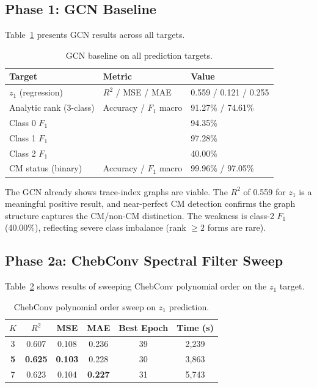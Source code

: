 \documentclass[11pt]{article}
\begin{document}
\subsection{Phase 1: GCN Baseline}

Table~\ref{tab:gcn-baseline} presents GCN results across all targets.

\begin{table}[t]
\centering
\caption{GCN baseline on all prediction targets.}
\label{tab:gcn-baseline}
\begin{tabular}{@{}lll@{}}
\toprule
Target & Metric & Value \\
\midrule
$z_1$ (regression) & $R^2$ / MSE / MAE & 0.559 / 0.121 / 0.255 \\
\midrule
Analytic rank (3-class) & Accuracy / $F_1$ macro & 91.27\% / 74.61\% \\
\quad Class 0 $F_1$ & & 94.35\% \\
\quad Class 1 $F_1$ & & 97.28\% \\
\quad Class 2 $F_1$ & & 40.00\% \\
\midrule
CM status (binary) & Accuracy / $F_1$ macro & 99.96\% / 97.05\% \\
\bottomrule
\end{tabular}
\end{table}

The GCN already shows trace-index graphs are viable. The $R^2$ of 0.559 for $z_1$ is a meaningful positive result, and near-perfect CM detection confirms the graph structure captures the CM/non-CM distinction. The weakness is class-2 $F_1$ (40.00\%), reflecting severe class imbalance (rank $\geq 2$ forms are rare).

\subsection{Phase 2a: ChebConv Spectral Filter Sweep}

Table~\ref{tab:cheb-sweep} shows results of sweeping ChebConv polynomial order on the $z_1$ target.

\begin{table}[t]
\centering
\caption{ChebConv polynomial order sweep on $z_1$ prediction.}
\label{tab:cheb-sweep}
\begin{tabular}{@{}cccccc@{}}
\toprule
$K$ & $R^2$ & MSE & MAE & Best Epoch & Time (s) \\
\midrule
3 & 0.607 & 0.108 & 0.236 & 39 & 2,239 \\
\textbf{5} & \textbf{0.625} & \textbf{0.103} & 0.228 & 30 & 3,863 \\
7 & 0.623 & 0.104 & \textbf{0.227} & 31 & 5,743 \\
\bottomrule
\end{tabular}
\end{table}
\end{document}
